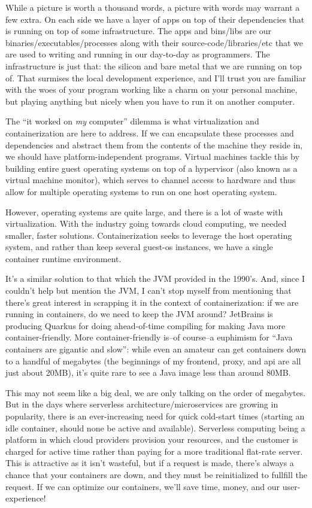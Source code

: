 \documentclass[11pt, twoside, reqno]{book}
\begin{document}
While a picture is worth a thousand words, a picture with words may warrant a few extra. On each side we have a layer of apps on top of their dependencies that is running on top of some infrastructure. The apps and bins/libs are our binaries/executables/processes along with their source-code/libraries/etc that we are used to writing and running in our day-to-day as programmers. The infrastructure is just that: the silicon and bare metal that we are running on top of. That surmises the local development experience, and I'll trust you are familiar with the woes of your program working like a charm on your personal machine, but playing anything but nicely when you have to run it on another computer.

The ``it worked on \textit{my} computer'' dilemma is what virtualization and containerization are here to address. If we can encapsulate these processes and dependencies and abstract them from the contents of the machine they reside in, we should have platform-independent programs. Virtual machines tackle this by building entire guest operating systems on top of a hypervisor (also known as a virtual machine monitor), which serves to channel access to hardware and thus allow for multiple operating systems to run on one host operating system.

However, operating systems are quite large, and there is a lot of waste with virtualization. With the industry going towards cloud computing, we needed smaller, faster solutions. Containerization seeks to leverage the host operating system, and rather than keep several guest-os instances, we have a single container runtime environment.


It's a similar solution to that which the JVM provided in the 1990's. And, since I couldn't help but mention the JVM, I can't stop myself from mentioning that there's great interest in scrapping it in the context of containerization: if we are running in containers, do we need to keep the JVM around? JetBrains is producing Quarkus for doing ahead-of-time compiling for making Java more container-friendly. More container-friendly is--of course--a euphimism for ``Java containers are gigantic and slow'': while even an amateur can get containers down to a handful of megabytes (the beginnings of my frontend, proxy, and api are all just about 20MB), it's quite rare to see a Java image less than around 80MB.

This may not seem like a big deal, we are only talking on the order of megabytes. But in the days where serverless architecture/microservices are growing in popularity, there is an ever-increasing need for quick cold-start times (starting an idle container, should none be active and available). Serverless computing being a platform in which cloud providers provision your resources, and the customer is charged for active time rather than paying for a more traditional flat-rate server. This is attractive as it isn't wasteful, but if a request is made, there's always a chance that your containers are down, and they must be reinitialized to fullfill the request. If we can optimize our containers, we'll save time, money, and our user-experience!
\end{document}
